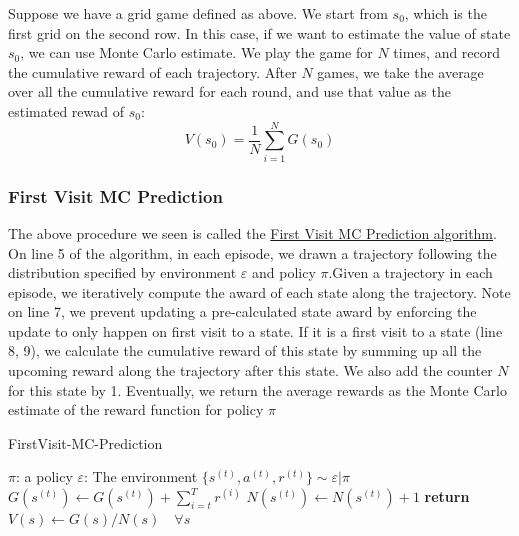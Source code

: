\documentclass[11pt]{article}
\begin{document}
Suppose we have a grid game defined as above. We start from \(s_0\), which is the first grid on the second row. In this case, if we want to estimate the value of state \(s_0\), we can use Monte Carlo estimate. We play the game for \(N\) times, and record the cumulative reward of each trajectory. After \(N\) games, we take the average over all the cumulative reward for each round, and use that value as the estimated rewad of \(s_0\):
\begin{equation}
V(s_0) = \dfrac{1}{N} \sum_{i=1}^N G(s_0)
\end{equation}

\subsubsection{First Visit MC Prediction}
The above procedure we seen is called the \hyperref[alg:fvmp]{First Visit MC Prediction algorithm}. On line 5 of the algorithm, in each episode, we drawn a trajectory following the distribution specified by environment \(\varepsilon\) and policy \(\pi\).Given a trajectory in each episode, we iteratively compute the award of each state along the trajectory. Note on line 7, we prevent updating a pre-calculated state award by enforcing the update to only happen on first visit to a state. If it is a first visit to a state (line 8, 9), we calculate the cumulative reward of this state by summing up all the upcoming reward along the trajectory after this state. We also add the counter \(N\) for this state by 1. Eventually, we return the average rewards as the Monte Carlo estimate of the reward function for policy \(\pi\)
\begin{algorithm}
\caption{FirstVisit-MC-Prediction}
\label{alg:fvmp}
\begin{algorithmic}[1]
\State $\pi$: a policy
\State $\varepsilon$: The environment
    \State $\{s^{(t)}, a^{(t)}, r^{(t)}\} \sim \varepsilon | \pi$
            \State $G(s^{(t)}) \gets G(s^{(t)}) + \sum_{i=t}^T r^{(i)}$
            \State $N(s^{(t)}) \gets N(s^{(t)}) + 1$
        \EndIf
        \EndFor
    \EndFor
    \State \textbf{return} $V(s) \gets G(s) / N(s) \quad \forall s$
    \EndProcedure
\end{algorithmic}
\end{algorithm}
\end{document}
